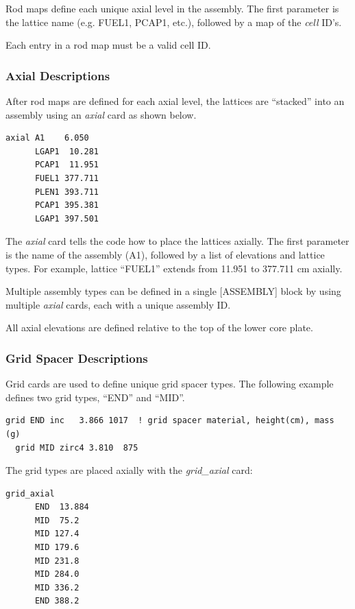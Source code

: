 Rod maps define each unique axial level in the assembly.
The first parameter is the lattice name (e.g. FUEL1, PCAP1, etc.),
followed by a map of the {\it cell} ID's.

Each entry in a rod map must be a valid cell ID.

\subsubsection{Axial Descriptions}

After rod maps are defined for each axial level, the lattices are ``stacked'' into
an assembly using an {\it axial} card as shown below.

\begin{Verbatim}[fontsize=\small]
  axial A1    6.050
      LGAP1  10.281
      PCAP1  11.951
      FUEL1 377.711
      PLEN1 393.711
      PCAP1 395.381
      LGAP1 397.501
\end{Verbatim}

The {\it axial} card tells the code how to place the lattices axially.
The first parameter is the name of the assembly (A1), followed by a
list of elevations and lattice types.
For example, lattice ``FUEL1'' extends from 11.951 to 377.711 cm axially.

Multiple assembly types can be defined in a single [ASSEMBLY] block by using
multiple {\it axial} cards, each with a unique assembly ID.

All axial elevations are defined relative to the top of the lower core plate.

\subsubsection{Grid Spacer Descriptions}

Grid cards are used to define unique grid spacer types.
The following example defines two grid types, ``END'' and ``MID''.
\begin{Verbatim}[fontsize=\small]
  grid END inc   3.866 1017  ! grid spacer material, height(cm), mass (g)
  grid MID zirc4 3.810  875
\end{Verbatim}

The grid types are placed axially with the {\it grid\_axial} card:
\vfill   %
\begin{Verbatim}[fontsize=\small]
  grid_axial
      END  13.884
      MID  75.2
      MID 127.4
      MID 179.6
      MID 231.8
      MID 284.0
      MID 336.2
      END 388.2
\end{Verbatim}

